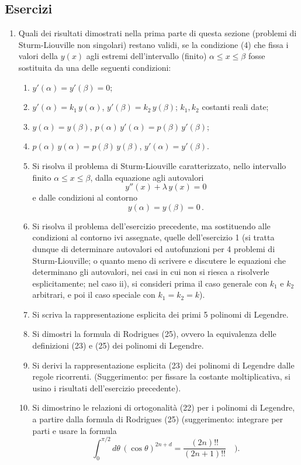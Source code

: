 \documentclass[11pt, a4paper]{book}
\numberwithin{equation}{section}
\newenvironment{esercizi}{\subsection*{Esercizi}\begin{enumerate}}{\end{enumerate}}
\begin{document}
\begin{esercizi}
\item Quali dei risultati dimostrati nella prima parte di questa sezione (problemi di Sturm-Liouville non singolari) restano validi,
se la condizione (4) che fissa i valori della $y(x)$ agli estremi
dell'intervallo (finito) $\alpha \leq x \leq \beta$ fosse sostituita da una delle
seguenti condizioni:
\begin{enumerate}
\item[i)] $y'(\alpha) = y'(\beta) = 0$;
\item[ii)] $y'(\alpha) = k_1\, y(\alpha)$, $y'(\beta) = k_2\, y(\beta)$; $k_1, k_2$ costanti reali date;
\item[iii)] $y(\alpha) = y(\beta)$, $p(\alpha)\, y'(\alpha) = p(\beta)\, y'(\beta)$;
\item[iv)] $p(\alpha)\, y(\alpha) = p(\beta)\, y(\beta)$, $y'(\alpha) = y'(\beta)$.


\item Si risolva il problema di Sturm-Liouville caratterizzato, nello
intervallo finito $\alpha \leq x \leq \beta$, dalla equazione agli autovalori
\[
y''(x) + \lambda\, y(x) = 0
\]
e dalle condizioni al contorno
\[
y(\alpha) = y(\beta) = 0 \,.
\]

\item Si risolva il problema dell'esercizio precedente, ma sostituendo
alle condizioni al contorno ivi assegnate, quelle dell'esercizio 1
(si tratta dunque di determinare autovalori ed autofunzioni per
4 problemi di Sturm-Liouville; o quanto meno di scrivere e discutere le equazioni che determinano gli autovalori, nei casi in
cui non si riesca a risolverle esplicitamente; nel caso ii), si
consideri prima il caso generale con $k_1$ e $k_2$ arbitrari, e poi
il caso speciale con $k_1 = k_2 = k$).

\item Si scriva la rappresentazione esplicita dei primi 5 polinomi di
Legendre.

\item Si dimostri la formula di Rodrigues (25), ovvero la equivalenza
delle definizioni (23) e (25) dei polinomi di Legendre.

\item Si derivi la rappresentazione esplicita (23) dei polinomi di Legendre
dalle regole ricorrenti. (Suggerimento: per fissare la costante moltiplicativa, si usino i risultati dell'esercizio precedente).

\item Si dimostrino le relazioni di ortogonalità (22) per i polinomi di
Legendre, a partire dalla formula di Rodrigues (25) (suggerimento:
integrare per parti e usare la formula
\[
\int_0^{\pi/2} d\theta\, (\cos\theta)^{2n+d} = \frac{(2n)!!}{(2n+1)!!} \quad ).
\]%


\end{enumerate}
\end{esercizi}
\end{document}
